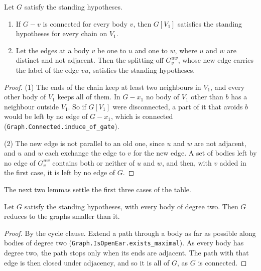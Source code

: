 \begin{lemma}
  \label{lem:pencil-x0-chain-standing}
  \leanok
  Let $G$ satisfy the standing hypotheses.
  \begin{enumerate}
    \item If $G - v$ is connected for every body $v$, then $G[V_1]$
      satisfies the standing hypotheses for every chain on $V_1$.
    \item Let the edges at a body $v$ be one to $u$ and one to $w$, where
      $u$ and $w$ are distinct and not adjacent. Then the splitting-off $G_v^{uw}$,
      whose new edge carries the label of the edge $vu$, satisfies the
      standing hypotheses.
  \end{enumerate}
\end{lemma}
\begin{proof}
  \leanok
  (1) The ends of the chain keep at least two neighbours in $V_1$, and
  every other body of $V_1$ keeps all of them. In $G - x_1$ no body of
  $V_1$ other than $b$ has a neighbour outside $V_1$. So if $G[V_1]$ were
  disconnected, a part of it that avoids $b$ would be left by no edge of
  $G - x_1$, which is connected
  (\texttt{Graph.Connected.induce\_of\_gate}).

  (2) The new edge is not parallel to an old one, since $u$ and $w$ are
  not adjacent, and $u$ and $w$ each exchange the edge to $v$ for the
  new edge. A set of bodies left by no edge of $G_v^{uw}$ contains both
  or neither of $u$ and $w$, and then, with $v$ added in the first case,
  it is left by no edge of $G$.
\end{proof}

The next two lemmas settle the first three cases of the table.

\begin{lemma}
  \label{lem:pencil-x0-cycle-reduces}
  \leanok
  Let $G$ satisfy the standing hypotheses, with every body of degree
  two. Then $G$ reduces to the graphs smaller than it.
\end{lemma}
\begin{proof}
  \leanok
  By the cycle clause. Extend a path through a body as far as possible
  along bodies of degree two (\texttt{Graph.IsOpenEar.exists\_maximal}).
  As every body has degree two, the path stops only when its ends are
  adjacent. The path with that edge is then closed under adjacency, and
  so it is all of $G$, as $G$ is connected.
\end{proof}

